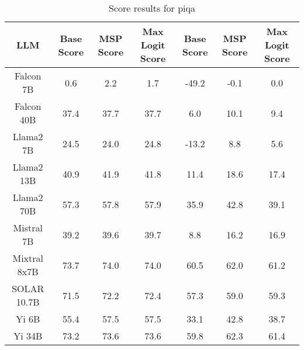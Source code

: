 \renewcommand\arraystretch{1.2}
\begin{table*}
\centering
\begin{tabular}{c|c|c|c|c|c|c}
LLM & Base Score & MSP Score & Max Logit Score & Base Score & MSP Score & Max Logit Score\\ \hline
Falcon 7B & 0.6 & 2.2 & 1.7 & -49.2 & -0.1 & 0.0\\
Falcon 40B & 37.4 & 37.7 & 37.7 & 6.0 & 10.1 & 9.4\\
Llama2 7B & 24.5 & 24.0 & 24.8 & -13.2 & 8.8 & 5.6\\
Llama2 13B & 40.9 & 41.9 & 41.8 & 11.4 & 18.6 & 17.4\\
Llama2 70B & 57.3 & 57.8 & 57.9 & 35.9 & 42.8 & 39.1\\
Mistral 7B & 39.2 & 39.6 & 39.7 & 8.8 & 16.2 & 16.9\\
Mixtral 8x7B & 73.7 & 74.0 & 74.0 & 60.5 & 62.0 & 61.2\\
SOLAR 10.7B & 71.5 & 72.2 & 72.4 & 57.3 & 59.0 & 59.3\\
Yi 6B & 55.4 & 57.5 & 57.5 & 33.1 & 42.8 & 38.7\\
Yi 34B & 73.2 & 73.6 & 73.6 & 59.8 & 62.3 & 61.4\\
\hline
\end{tabular}
\caption{Score results for piqa}
\end{table*}
\label{tab:piqa_score}
